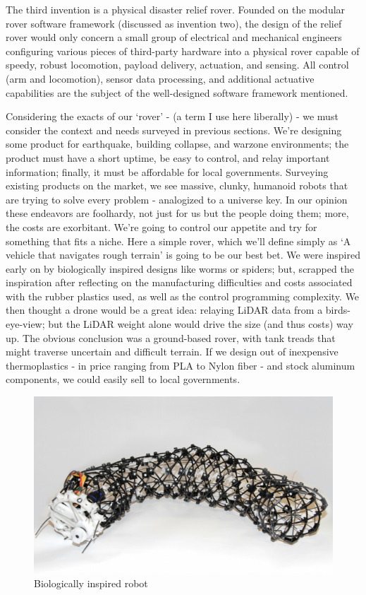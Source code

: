 \documentclass[a4paper, 10pt]{article}
\begin{document}
		The third invention is a physical disaster relief rover. Founded on the modular rover software framework (discussed as invention two), the design of the relief rover would only concern a small group of electrical and mechanical engineers configuring various pieces of third-party hardware into a physical rover capable of speedy, robust locomotion, payload delivery, actuation, and sensing. All control (arm and locomotion), sensor data processing, and additional actuative capabilities are the subject of the well-designed software framework mentioned.

		Considering the exacts of our `rover' - (a term I use here liberally) - we must consider the context and needs surveyed in previous sections. We're designing some product for earthquake, building collapse, and warzone environments; the product must have a short uptime, be easy to control, and relay important information; finally, it must be affordable for local governments. Surveying existing products on the market, we see massive, clunky, humanoid robots that are trying to solve every problem - analogized to a universe key. In our opinion these endeavors are foolhardy, not just for us but the people doing them; more, the costs are exorbitant. We're going to control our appetite and try for something that fits a niche. Here a simple rover, which we'll define simply as `A vehicle that navigates rough terrain' is going to be our best bet. We were inspired early on by biologically inspired designs like worms or spiders; but, scrapped the inspiration after reflecting on the manufacturing difficulties and costs associated with the rubber plastics used, as well as the control programming complexity. We then thought a drone would be a great idea: relaying LiDAR data from a birds-eye-view; but the LiDAR weight alone would drive the size (and thus costs) way up. The obvious conclusion was a ground-based rover, with tank treads that might traverse uncertain and difficult terrain. If we design out of inexpensive thermoplastics - in price ranging from PLA to Nylon fiber - and stock aluminum components, we could easily sell to local governments.
		
		\begin{figure} [!h]
			\centering
			\includegraphics[scale=0.5]{Photos/worm_bot}
			\caption{Biologically inspired robot}
			\label{worm_bot}
		\end{figure}
\end{document}
